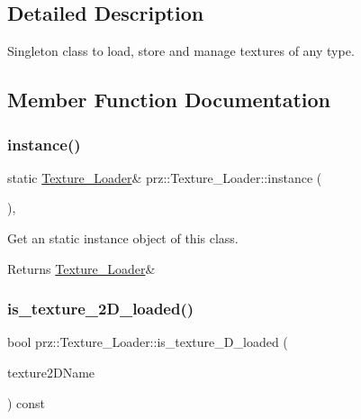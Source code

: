 \subsection{Detailed Description}
Singleton class to load, store and manage textures of any type. 



\subsection{Member Function Documentation}
\mbox{\label{classprz_1_1_texture___loader_ad4ec3289aad70624cf0ae28048e84778}} 
\subsubsection{\texorpdfstring{instance()}{instance()}}
{\footnotesize\ttfamily static \mbox{\hyperlink{classprz_1_1_texture___loader}{Texture\+\_\+\+Loader}}\& prz\+::\+Texture\+\_\+\+Loader\+::instance (\begin{DoxyParamCaption}{ }\end{DoxyParamCaption})\hspace{0.3cm}{\ttfamily [inline]}, {\ttfamily [static]}}



Get an static instance object of this class. 

\begin{DoxyReturn}{Returns}
\mbox{\hyperlink{classprz_1_1_texture___loader}{Texture\+\_\+\+Loader}}\& 
\end{DoxyReturn}
\mbox{\label{classprz_1_1_texture___loader_ac57a1e14179f8aff43030b2c5f85ca59}} 
\subsubsection{\texorpdfstring{is\_texture\_2D\_loaded()}{is\_texture\_2D\_loaded()}}
{\footnotesize\ttfamily bool prz\+::\+Texture\+\_\+\+Loader\+::is\+\_\+texture\+\_\+D\+\_\+loaded (\begin{DoxyParamCaption}\item[{const P\+String \&}]{texture2\+D\+Name }\end{DoxyParamCaption}) const\hspace{0.3cm}{\ttfamily [inline]}}



